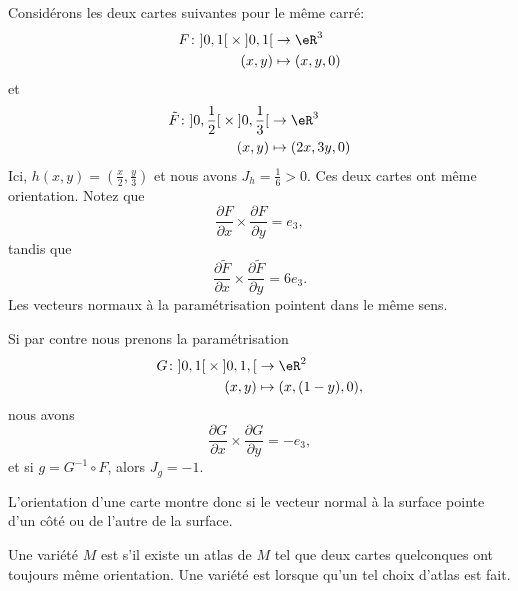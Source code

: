 Considérons les deux cartes suivantes pour le même carré:
\begin{equation}
	\begin{aligned}
		F\colon\mathopen] 0 , 1 \mathclose[\times \mathopen] 0 , 1 \mathclose[ &\to \eR^3 \\
		(x,y)&\mapsto (x,y,0)
	\end{aligned}
\end{equation}
et
\begin{equation}
	\begin{aligned}
		\tilde F\colon\mathopen] 0 , \frac{ 1 }{2} \mathclose[\times\mathopen] 0 , \frac{1}{ 3 } \mathclose[ &\to \eR^3 \\
		(x,y)&\mapsto (2x,3y,0)
	\end{aligned}
\end{equation}
Ici, $h(x,y)=\left( \frac{ x }{ 2 },\frac{ y }{ 3 } \right)$ et nous avons $J_h=\frac{1}{ 6 }>0$. Ces deux cartes ont même orientation. Notez que
\begin{equation}
	\frac{ \partial F }{ \partial x }\times\frac{ \partial F }{ \partial y }=e_3,
\end{equation}
tandis que
\begin{equation}
	\frac{ \partial \tilde F }{ \partial x }\times\frac{ \partial \tilde F }{ \partial y }=6e_3.
\end{equation}
Les vecteurs normaux à la paramétrisation pointent dans le même sens.

Si par contre nous prenons la paramétrisation
\begin{equation}
	\begin{aligned}
		G\colon \mathopen] 0,1 \mathclose[\times\mathopen] 0,1 ,  \mathclose[&\to \eR^2 \\
		(x,y)&\mapsto (x,(1-y),0),
	\end{aligned}
\end{equation}
nous avons
\begin{equation}
	\frac{ \partial G }{ \partial x }\times\frac{ \partial G }{ \partial y }=-e_3,
\end{equation}
et si $g=G^{-1}\circ F$, alors $J_g=-1$.

L'orientation d'une carte montre donc si le vecteur normal à la surface pointe d'un côté ou de l'autre de la surface.

\begin{definition}
	Une variété $M$ est  s'il existe un atlas de $M$ tel que deux cartes quelconques ont toujours même orientation. Une variété est  lorsque qu'un tel choix d'atlas est fait.
\end{definition}

